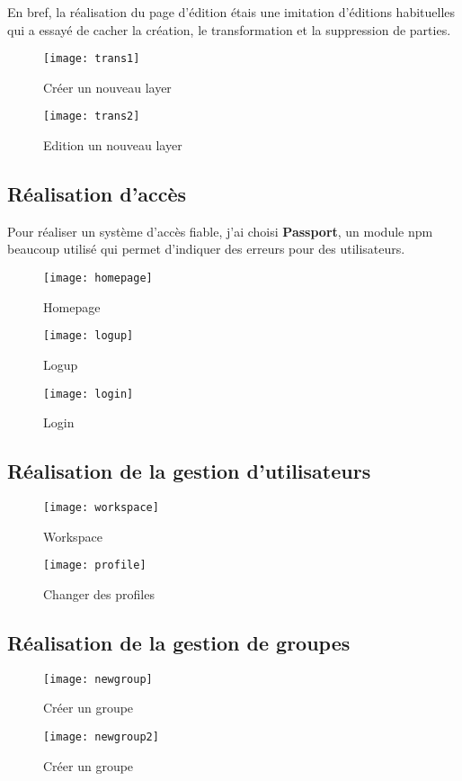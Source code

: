 En bref, la réalisation du page d'édition étais une imitation d'éditions habituelles qui a essayé de cacher la création, le transformation et la suppression de parties. 

\begin{figure}[H]
\centering
\texttt{[image: trans1]}
\caption{Créer un nouveau layer}
\end{figure}

\begin{figure}[H]
\centering
\texttt{[image: trans2]}
\caption{Edition un nouveau layer}
\end{figure}

\subsection{Réalisation d'accès}

Pour réaliser un système d'accès fiable, j'ai choisi \textbf{Passport}, un module npm beaucoup utilisé qui permet d'indiquer des erreurs pour des utilisateurs.

\begin{figure}[H]
\centering
\texttt{[image: homepage]}
\caption{Homepage}
\end{figure}

\begin{figure}[H]
\centering
\texttt{[image: logup]}
\caption{Logup}
\end{figure}

\begin{figure}[H]
\centering
\texttt{[image: login]}
\caption{Login}
\end{figure}

\subsection{Réalisation de la gestion d'utilisateurs}

\begin{figure}[H]
\centering
\texttt{[image: workspace]}
\caption{Workspace}
\end{figure}

\begin{figure}[H]
\centering
\texttt{[image: profile]}
\caption{Changer des profiles}
\end{figure}

\subsection{Réalisation de la gestion de groupes}

\begin{figure}[H]
\centering
\texttt{[image: newgroup]}
\caption{Créer un groupe}
\end{figure}

\begin{figure}[H]
\centering
\texttt{[image: newgroup2]}
\caption{Créer un groupe}
\end{figure}
